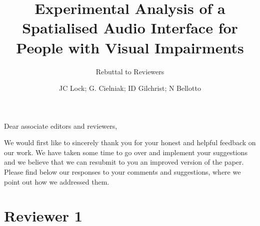 \documentclass{scrartcl}
\begin{document}
\title{Experimental Analysis of a Spatialised Audio Interface for People with Visual Impairments}
\subtitle{Rebuttal to Reviewers}

\author{JC Lock; G. Cielniak; ID Gilchrist; N Bellotto}

\maketitle


\noindent Dear associate editors and reviewers,

We would first like to sincerely thank you for your honest and helpful feedback on our work.
We have taken some time to go over and implement your suggestions and we believe that we can resubmit to you an improved version of the paper. 
Please find below our responses to your comments and suggestions, where we point out how we addressed them.

\section*{Reviewer 1} 
\end{document}
